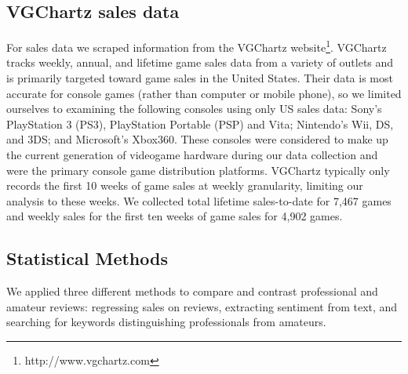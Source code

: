 \documentclass{sig-alternate}
\begin{document}
\subsection{VGChartz sales data}
For sales data we scraped information from the VGChartz website\footnote{http://www.vgchartz.com}. VGChartz tracks weekly, annual, and lifetime game sales data from a variety of outlets and is primarily targeted toward game sales in the United States. Their data is most accurate for console games (rather than computer or mobile phone), so we limited ourselves to examining the following consoles using only US sales data: Sony's PlayStation 3 (PS3), PlayStation Portable (PSP) and Vita; Nintendo's Wii, DS, and 3DS; and Microsoft's Xbox360. These consoles were considered to make up the current generation of videogame hardware during our data collection and were the primary console game distribution platforms. VGChartz typically only records the first 10 weeks of game sales at weekly granularity, limiting our analysis to these weeks. We collected total lifetime sales-to-date for 7,467 games and weekly sales for the first ten weeks of game sales for 4,902 games.

\subsection{Statistical Methods}
We applied three different methods to compare and contrast professional
and amateur reviews: regressing sales on reviews, extracting sentiment
from text, and searching for keywords distinguishing professionals from
amateurs.
\end{document}

